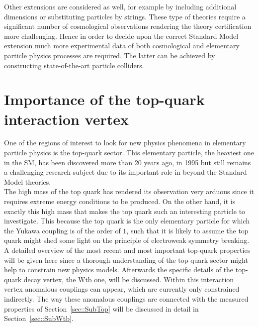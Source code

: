 Other extensions are considered as well, for example by including additional dimensions or substituting particles by strings. These type of theories require a significant number of cosmological observations rendering the theory certification more challenging. %
Hence in order to decide upon the correct Standard Model extension much more experimental data of both cosmological and elementary particle physics processes are required. The latter can be achieved by constructing state-of-the-art particle colliders.

\section{Importance of the top-quark interaction vertex} \label{sec::TopQuarkPhysics}
One of the regions of interest to look for new physics phenomena in elementary particle physics is the top-quark sector. This elementary particle, the heaviest one in the SM, has been discovered more than 20 years ago, in 1995 but still remains a challenging research subject due to its important role in beyond the Standard Model theories. 
\\
The high mass of the top quark has rendered its observation very arduous since it requires extreme energy conditions to be produced. 
On the other hand, it is exactly this high mass that makes the top quark such an interesting particle to investigate.
This because the top quark is the only elementary particle for which the Yukawa coupling is of the order of $1$, such that it is likely to assume the top quark might shed some light on the principle of electroweak symmetry breaking.
\\
A detailed overview of the most recent and most important top-quark properties will be given here since a thorough understanding of the top-quark sector might help to constrain new physics models.
Afterwards the specific details of the top-quark decay vertex, the Wtb one, will be discussed. Within this interaction vertex anomalous couplings can appear, which are currently only constrained indirectly. The way these anomalous couplings are connected with the measured properties of Section~\ref{sec::SubTop} will be discussed in detail in Section~\ref{sec::SubWtb}.
